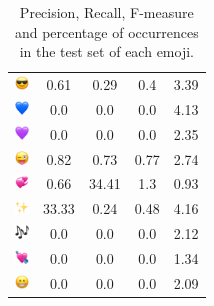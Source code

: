 \documentclass{article}
\begin{document}
\begin{table}
\begin{tabular}{|c|ccc|c|}
\includegraphics[height=0.37cm,width=0.37cm]{img/smiling_face_with_sunglasses.png} & 0.61 & 0.29 & 0.4 & 3.39\\ 
\includegraphics[height=0.37cm,width=0.37cm]{img/blue_heart.png} & 0.0 & 0.0 & 0.0 & 4.13\\ 
\includegraphics[height=0.37cm,width=0.37cm]{img/purple_heart.png} & 0.0 & 0.0 & 0.0 & 2.35\\ 
\includegraphics[height=0.37cm,width=0.37cm]{img/winking_face_with_tongue.png} & 0.82 & 0.73 & 0.77 & 2.74\\ 
\includegraphics[height=0.37cm,width=0.37cm]{img/revolving_hearts.png} & 0.66 & 34.41 & 1.3 & 0.93\\ 
\includegraphics[height=0.37cm,width=0.37cm]{img/sparkles.png} & 33.33 & 0.24 & 0.48 & 4.16\\ 
\includegraphics[height=0.37cm,width=0.37cm]{img/musical_notes.png} & 0.0 & 0.0 & 0.0 & 2.12\\ 
\includegraphics[height=0.37cm,width=0.37cm]{img/heart_with_arrow.png} & 0.0 & 0.0 & 0.0 & 1.34\\ 
\includegraphics[height=0.37cm,width=0.37cm]{img/beaming_face_with_smiling_eyes.png} & 0.0 & 0.0 & 0.0 & 2.09\\ 

\hline
\end{tabular}
\caption{\label{table:emoji_detailed} Precision, Recall, F-measure and percentage of occurrences in the test set of each emoji.}
\end{table}
\end{document}
